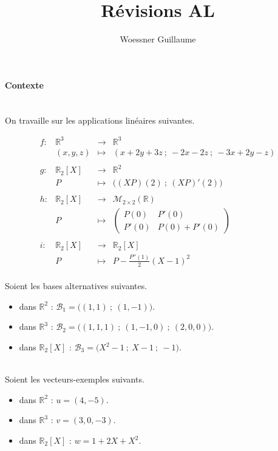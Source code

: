 \documentclass[12pt]{article}
\author{Woessner Guillaume}
\title{Révisions AL}         %
\date{}                       %
\begin{document}
\maketitle                %

\paragraph{Contexte}~\\

\noindent On travaille sur les applications linéaires suivantes.

\[
\begin{array}{rccl}
f : & \mathbb{R}^3 & \longrightarrow & \mathbb{R}^3 \\
~& (x,y,z) & \longmapsto & (x+2y+3z ~;~ -2x-2z ~;~ -3x+2y-z)\\
~&~&~&\\
g : & \mathbb{R}_2[X] & \longrightarrow & \mathbb{R}^2 \\
~& P & \longmapsto & \Big((XP)(2) ~;~ (XP)'(2)\Big)\\
~&~&~&\\
h : & \mathbb{R}_2[X] & \longrightarrow & \mathcal{M}_{2\times 2}(\mathbb{R}) \\
~& P & \longmapsto & 
\begin{pmatrix}
P(0) & P'(0) \\
P'(0) & P(0) + P'(0)
\end{pmatrix}\\
~&~&~&\\
i : & \mathbb{R}_2[X] & \longrightarrow & \mathbb{R}_2[X] \\
~& P & \longmapsto & P - \frac{P''(1)}{2}(X-1)^2
\end{array}
\]
~\\
Soient les bases alternatives suivantes.
\begin{itemize}
\item[$\bullet$] dans $\mathbb{R}^2$ : $\mathcal{B}_1 = \Big( (1,1) ~;~(1,-1)\Big)$.
\item[$\bullet$] dans $\mathbb{R}^3$ : $\mathcal{B}_2 = \Big( (1,1,1) ~;~ (1,-1,0) ~;~ (2,0,0)\Big)$.
\item[$\bullet$] dans $\mathbb{R}_2[X]$ : $\mathcal{B}_3 = \Big( X^2-1 ~;~ X-1 ~;~ -1\Big)$.
\end{itemize}
~\\
Soient les vecteurs-exemples suivants.
\begin{itemize}
\item[$\bullet$] dans $\mathbb{R}^2$ : $u=(4,-5)$.
\item[$\bullet$] dans $\mathbb{R}^3$ : $v=(3,0,-3)$.
\item[$\bullet$] dans $\mathbb{R}_2[X]$ : $w = 1 + 2X + X^2$.
\end{itemize}
\end{document}
